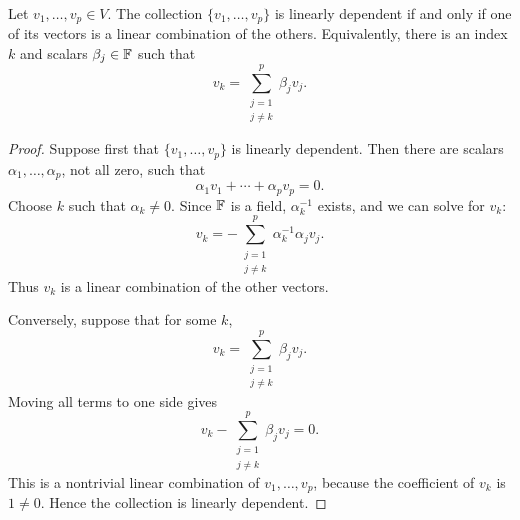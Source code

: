 \begin{proposition}\label{prop:dependence-redundancy}
  Let $v_1,\ldots,v_p\in V$. The collection
  $\{v_1,\ldots,v_p\}$ is linearly dependent if and only if one of its
  vectors is a linear combination of the others. Equivalently, there is
  an index $k$ and scalars $\beta_j\in\mathbb{F}$ such that
  \[
    v_k=\sum_{\substack{j=1\\j\neq k}}^p\beta_jv_j.
  \]
\end{proposition}

\begin{proof}
  Suppose first that $\{v_1,\ldots,v_p\}$ is linearly dependent. Then
  there are scalars $\alpha_1,\ldots,\alpha_p$, not all zero, such that
  \[
    \alpha_1v_1+\cdots+\alpha_pv_p=0.
  \]
  Choose $k$ such that $\alpha_k\neq0$. Since $\mathbb{F}$ is a field,
  $\alpha_k^{-1}$ exists, and we can solve for $v_k$:
  \[
    v_k
    =-\sum_{\substack{j=1\\j\neq k}}^p
      \alpha_k^{-1}\alpha_jv_j.
  \]
  Thus $v_k$ is a linear combination of the other vectors.

  Conversely, suppose that for some $k$,
  \[
    v_k=\sum_{\substack{j=1\\j\neq k}}^p\beta_jv_j.
  \]
  Moving all terms to one side gives
  \[
    v_k-\sum_{\substack{j=1\\j\neq k}}^p\beta_jv_j=0.
  \]
  This is a nontrivial linear combination of $v_1,\ldots,v_p$, because
  the coefficient of $v_k$ is $1\neq0$. Hence the collection is linearly
  dependent.
\end{proof}
